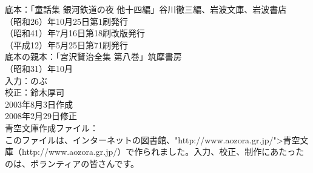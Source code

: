 \documentclass[
a4paper,
10pt,
book]
{tarticle}
\begin{document}
\newpage
底本：「童話集 銀河鉄道の夜 他十四編」谷川徹三編、岩波文庫、岩波書店
\\
（昭和26）年10月25日第1刷発行\\
（昭和41）年7月16日第18刷改版発行\\
（平成12）年5月25日第71刷発行\\
底本の親本：「宮沢賢治全集 第八巻」筑摩書房\\
（昭和31）年10月\\
入力：のぶ\\
校正：鈴木厚司\\
2003年8月3日作成\\
2008年2月29日修正\\
青空文庫作成ファイル：\\
このファイルは、インターネットの図書館、"http://www.aozora.gr.jp/">青空文庫（http://www.aozora.gr.jp/）で作られました。入力、校正、制作にあたったのは、ボランティアの皆さんです。\\
\\
\\

\begin{comment}
\end{comment}
\end{document}

